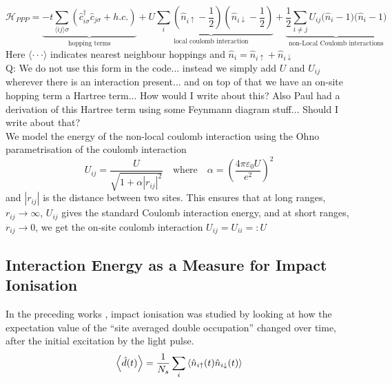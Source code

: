 \begin{equation}
    \mathcal{H}_{PPP} = \underbrace{-t \sum_{\langle ij \rangle \sigma} \left(\hat{c}^\dagger_{i\sigma}\hat{c}_{j\sigma} + h.c.\right) 
    }_{\text{hopping terms}}
    + \underbrace{U \sum_i \left(\hat{n}_{i\uparrow} - \frac{1}{2}\right)\left(\hat{n}_{i\downarrow} - \frac{1}{2}\right)
    }_{\text{local coulomb interaction}}
    + \underbrace{\frac{1}{2}\sum_{i\neq j} U_{ij} \bigg(\hat{n}_{i} - 1\bigg)\bigg(\hat{n}_{i} - 1\bigg)
    }_{\text{non-Local Coulomb interactions}}
\end{equation}
Here $\langle \cdot\cdot\cdot \rangle$ indicates nearest neighbour hoppings and $\hat{n}_i = \hat{n}_{i\uparrow} + \hat{n}_{i\downarrow}$
\\

{\color{red} Q: We do not use this form in the code... instead we simply add $U$ and $U_{ij}$ wherever there is an interaction present... and on top of that we have an on-site hopping term a Hartree term... How would I write about this? Also Paul had a derivation of this Hartree term using some Feynmann diagram stuff... Should I write about that?}
\\

We model the energy of the non-local coulomb interaction using the Ohno parametrisation of the coulomb interaction  \cite{ppp_ohno, hoerbinger}
\begin{equation}
    U_{ij} = \frac{U}{\sqrt{1 + \alpha |r_{ij}|^2}} \quad \text{where} \quad \alpha = \left(\frac{4\pi\varepsilon_0 U}{e^2} \right)^2 \label{eq:ohno_interpolation}
\end{equation}
and $|r_{ij}|$ is the distance between two sites. This ensures that at long ranges, $r_{ij}\to\infty$, $U_{ij}$ gives the standard Coulomb interaction energy, and at short ranges, $r_{ij}\to 0$, we get the on-site coulomb interaction $U_{ij} = U_{ii} =: U$ 

\subsection{Interaction Energy as a Measure for Impact Ionisation}
In the preceding works \cite{innerberger,worm_bachelor,worm_project,prauhart}, impact ionisation was studied by looking at how the expectation value of the ``site averaged double occupation'' changed over time, after the initial excitation by the light pulse.
\begin{equation}
    \left\langle{\hat{d}(t)}\right\rangle = \frac{1}{N_s}\sum_i \braket{\hat{n}_{i\uparrow}(t)\hat{n}_{i\downarrow}(t)}
\end{equation}

